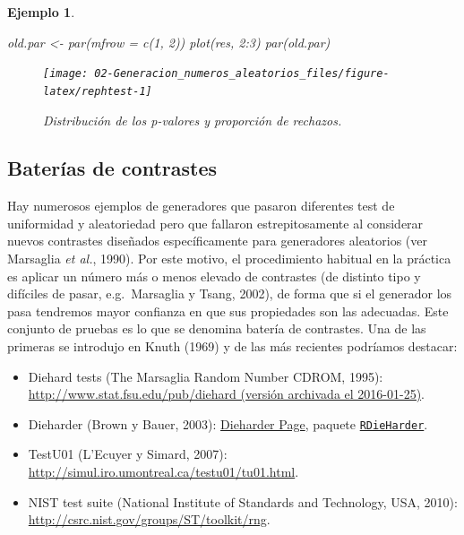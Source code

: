 \documentclass[
]{book}
\newenvironment{Shaded}{\begin{snugshade}}{\end{snugshade}}
\newcommand{\AttributeTok}[1]{\textcolor[rgb]{0.77,0.63,0.00}{#1}}
\newcommand{\DecValTok}[1]{\textcolor[rgb]{0.00,0.00,0.81}{#1}}
\newcommand{\FunctionTok}[1]{\textcolor[rgb]{0.00,0.00,0.00}{#1}}
\newcommand{\NormalTok}[1]{#1}
\newcommand{\OtherTok}[1]{\textcolor[rgb]{0.56,0.35,0.01}{#1}}
\newcommand{\SpecialCharTok}[1]{\textcolor[rgb]{0.00,0.00,0.00}{#1}}
\theoremstyle{break}
\newtheorem{example}{Ejemplo}[chapter]
\theoremstyle{nonumberplain}
\begin{document}
\begin{example}
\begin{Shaded}
\begin{Highlighting}[]
\NormalTok{old.par }\OtherTok{\textless{}{-}} \FunctionTok{par}\NormalTok{(}\AttributeTok{mfrow =} \FunctionTok{c}\NormalTok{(}\DecValTok{1}\NormalTok{, }\DecValTok{2}\NormalTok{))}
\FunctionTok{plot}\NormalTok{(res, }\DecValTok{2}\SpecialCharTok{:}\DecValTok{3}\NormalTok{)}
\FunctionTok{par}\NormalTok{(old.par)}
\end{Highlighting}
\end{Shaded}

\begin{figure}[!htb]

{\centering \texttt{[image: 02-Generacion\_numeros\_aleatorios\_files/figure-latex/rephtest-1]} 

}

\caption{Distribución de los p-valores y proporción de rechazos.}\label{fig:rephtest}
\end{figure}

\end{example}

\hypertarget{baterias}{%
\subsection{Baterías de contrastes}\label{baterias}}

Hay numerosos ejemplos de generadores que pasaron diferentes test de uniformidad y aleatoriedad pero que fallaron estrepitosamente al considerar nuevos contrastes diseñados específicamente para generadores aleatorios (ver Marsaglia \emph{et al.}, 1990).
Por este motivo, el procedimiento habitual en la práctica es aplicar un número más o menos elevado de contrastes (de distinto tipo y difíciles de pasar, e.g.~Marsaglia y Tsang, 2002), de forma que si el generador los pasa tendremos mayor confianza en que sus propiedades son las adecuadas.
Este conjunto de pruebas es lo que se denomina batería de contrastes. Una de las primeras se introdujo en Knuth (1969) y de las más recientes podríamos destacar:

\begin{itemize}
\item
  Diehard tests (The Marsaglia Random Number CDROM, 1995):
  \href{https://web.archive.org/web/20160125103112/http://stat.fsu.edu/pub/diehard}{http://www.stat.fsu.edu/pub/diehard (versión archivada el 2016-01-25)}.
\item
  Dieharder (Brown y Bauer, 2003):
  \href{https://webhome.phy.duke.edu/~rgb/General/dieharder.php}{Dieharder Page},
  paquete \href{https://github.com/eddelbuettel/rdieharder}{\texttt{RDieHarder}}.
\item
  TestU01 (L'Ecuyer y Simard, 2007):
  \url{http://simul.iro.umontreal.ca/testu01/tu01.html}.
\item
  NIST test suite (National Institute of Standards and Technology, USA, 2010):
  \url{http://csrc.nist.gov/groups/ST/toolkit/rng}.
\end{itemize}
\end{document}
